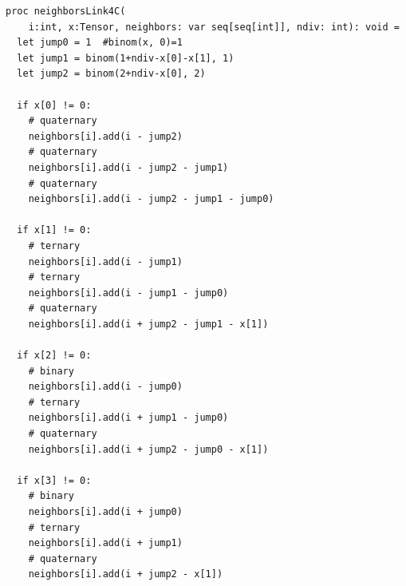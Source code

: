 \begin{verbatim}
proc neighborsLink4C(
    i:int, x:Tensor, neighbors: var seq[seq[int]], ndiv: int): void =
  let jump0 = 1  #binom(x, 0)=1
  let jump1 = binom(1+ndiv-x[0]-x[1], 1)
  let jump2 = binom(2+ndiv-x[0], 2)
  
  if x[0] != 0:
    # quaternary
    neighbors[i].add(i - jump2)
    # quaternary
    neighbors[i].add(i - jump2 - jump1)
    # quaternary
    neighbors[i].add(i - jump2 - jump1 - jump0) 
  
  if x[1] != 0:
    # ternary
    neighbors[i].add(i - jump1)    
    # ternary
    neighbors[i].add(i - jump1 - jump0)         
    # quaternary
    neighbors[i].add(i + jump2 - jump1 - x[1])  
  
  if x[2] != 0:
    # binary
    neighbors[i].add(i - jump0)     
    # ternary
    neighbors[i].add(i + jump1 - jump0)    
    # quaternary
    neighbors[i].add(i + jump2 - jump0 - x[1])  
  
  if x[3] != 0:
    # binary
    neighbors[i].add(i + jump0)        
    # ternary
    neighbors[i].add(i + jump1)          
    # quaternary     
    neighbors[i].add(i + jump2 - x[1])              
\end{verbatim}

\printbibliography[heading=subbibintoc]